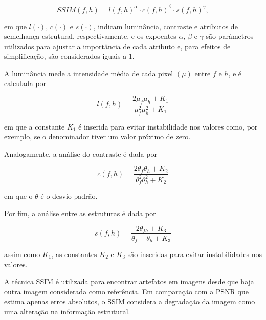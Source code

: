 \begin{equation}\label{eq:ssim1}
    SSIM(f,h) = l(f,h)^\alpha \cdot c(f,h)^\beta \cdot s(f,h)^\gamma, 
\end{equation}

em que $l(\cdot)$, $c(\cdot)$ e $s(\cdot)$, indicam luminância, contraste e atributos de semelhança estrutural, respectivamente, e os expoentes $\alpha$, $\beta$ e $\gamma$ são parâmetros utilizados para ajustar a importância de cada atributo e, para efeitos de simplificação, são considerados iguais a $1$.

A luminância mede a intensidade média de cada pixel $(\mu)$ entre $f$ e $h$, e é calculada por

\begin{equation}\label{eq:ssim2}
    l(f,h) = \frac{ 2\mu_f \mu_h + K_1}{\mu_f^2 \mu_h^2 + K_1}
\end{equation}

em que a constante $K_1$ é inserida para evitar instabilidade nos valores como, por exemplo, se o denominador tiver um valor próximo de zero.

Analogamente, a análise do contraste é dada por

\begin{equation}\label{eq:ssim3}
    c(f,h) = \frac{ 2\theta_f \theta_h + K_2}{\theta_f^2 \theta_h^2 + K_2}
\end{equation}

em que o $\theta$ é o desvio padrão.

Por fim, a análise entre as estruturas é dada por

\begin{equation}\label{eq:ssim4}
    s(f,h) = \frac{ 2\theta_{fh} + K_3}{\theta_f + \theta_h + K_3}
\end{equation}

assim como $K_1$, as constantes $K_2$ e $K_3$ são inseridas para evitar instabilidades nos valores.

A técnica SSIM é utilizada para encontrar artefatos em imagens desde que haja outra imagem considerada como referência. Em comparação com a PSNR que estima apenas erros absolutos, o SSIM considera a degradação da imagem como uma alteração na informação estrutural.